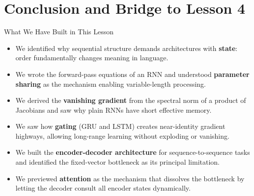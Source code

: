 \documentclass[aspectratio=169]{beamer}
\begin{document}
\section{Conclusion and Bridge to Lesson 4}
%
\begin{frame}{What We Have Built in This Lesson}
\begin{itemize}
    \item We identified why sequential structure demands architectures with \textbf{state}:
          order fundamentally changes meaning in language.
    \item We wrote the forward-pass equations of an RNN and understood
          \textbf{parameter sharing} as the mechanism enabling variable-length processing.
    \item We derived the \textbf{vanishing gradient} from the spectral norm of a product of Jacobians
          and saw why plain RNNs have short effective memory.
    \item We saw how \textbf{gating} (GRU and LSTM) creates near-identity gradient highways,
          allowing long-range learning without exploding or vanishing.
    \item We built the \textbf{encoder-decoder architecture} for sequence-to-sequence tasks
          and identified the fixed-vector bottleneck as its principal limitation.
    \item We previewed \textbf{attention} as the mechanism that dissolves the bottleneck
          by letting the decoder consult all encoder states dynamically.
\end{itemize}

\end{frame}
%
%
\end{document}

